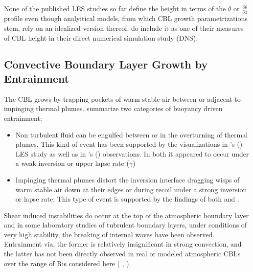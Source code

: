 None of the published \acs{LES} studies so far define the height in terms of the $\overline{\theta}$ or $\frac{\partial \overline{\theta}}{\partial z}$ profile even though analyitical models, from which \acs{CBL} growth parametrizations stem, rely on an idealized version thereof. \citeauthor{GarciaMellado} \citeyear{GarciaMellado} do include it as one of their measures of \acs{CBL} height in their direct numerical
simulation study (\acs{DNS}).       

\subsection{Convective Boundary Layer Growth by Entrainment}
\label{subsec:}

The \acs{CBL} grows by trapping pockets of warm stable air between
or adjacent to impinging thermal plumes.  \citeauthor{Traum11} \cite{Traum11} summarize two categories of buoyancy driven entrainment:\\

\begin{itemize}

\item{Non turbulent fluid can be engulfed between or in the overturning of thermal plumes. This kind of event has been supported by the visualizations in \citeauthor{SullMoengStev}'s (\citeyear{SullMoengStev}) \acs{LES} study as well as in \citeauthor{Traum11}'s (\citeyear{Traum11}) observations. In both it appeared to occur under a weak inversion or upper lapse rate ($\gamma$)}

\item{
Impinging thermal plumes distort the inversion interface dragging wisps of warm stable air down at their edges or during recoil under a strong inversion or lapse rate. This type of event is supported by the findings  of both \citeauthor{SullMoengStev} \cite{SullMoengStev} and \citeauthor{Traum11} \cite{Traum11}.}

\end{itemize}

Shear induced instabilities do occur at the top of the atmospheric boundary layer and in some laboratory studies of tubrulent boundary layers, under conditions of very high stability, the breaking of internal waves have been observed.  Entrainment via, the former is relatively insignificant in strong convection, and the latter has not been directly observed in real or modeled atmospheric \acs{CBL}s over the range of \acs{Ri}s considered here (\citeauthor{Traum11} \citeyear{Traum11}, \citeauthor{SullMoengStev} \citeyear{SullMoengStev}).


